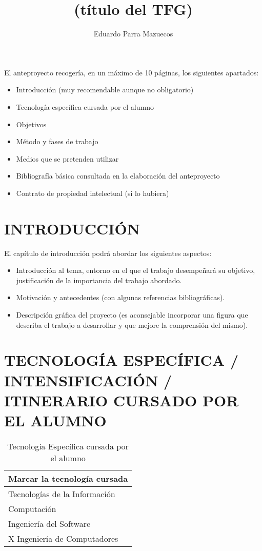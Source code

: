 \documentclass{pre-tfg}
\title{(título del TFG)}
\author{Eduardo Parra Mazuecos}
\begin{document}
\maketitle
\tableofcontents

\newpage

El anteproyecto recogería, en un \textcolor[rgb]{0.5,0.0,0.0}{máximo de 10 páginas},
los siguientes apartados:

\begin{itemize}
\item Introducción (muy recomendable aunque no obligatorio)
\item Tecnología específica cursada por el alumno
\item Objetivos
\item Método y fases de trabajo
\item Medios que se pretenden utilizar
\item Bibliografía básica consultada en la elaboración del anteproyecto
\item Contrato de propiedad intelectual (si lo hubiera)
\end{itemize}


\section{INTRODUCCIÓN}

El capítulo de introducción podrá abordar los siguientes aspectos:

\begin{itemize}
\item Introducción al tema, entorno en el que el trabajo desempeñará
  su objetivo, justificación de la importancia del trabajo abordado.
\item Motivación y antecedentes (con algunas referencias bibliográficas).
\item Descripción gráfica del proyecto (es aconsejable incorporar una figura que describa
  el trabajo a desarrollar y que mejore la comprensión del mismo).
\end{itemize}


\section{TECNOLOGÍA ESPECÍFICA / INTENSIFICACIÓN / ITINERARIO CURSADO POR EL ALUMNO}


\begin{table}[hp]
  \centering
  \caption{Tecnología Específica cursada por el alumno}
  \label{tab:tec-especifica}

  \begin{tabular}{p{}}
    \textbf{Marcar la tecnología cursada} \\
    \hline
    Tecnologías de la Información \\
    Computación \\
    Ingeniería del Software \\ X
    Ingeniería de Computadores \\
    \hline
  \end{tabular}
\end{table}
\end{document}
